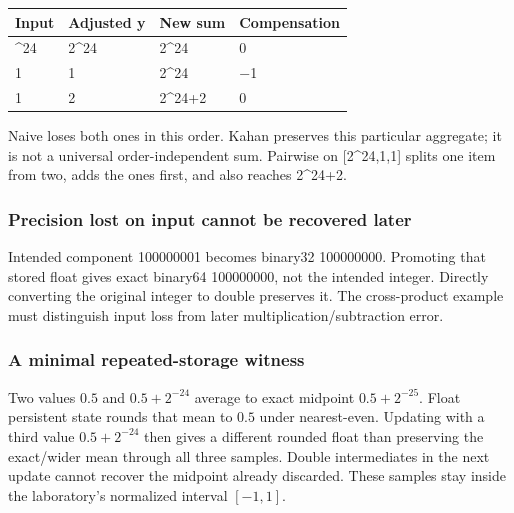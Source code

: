 \hypertarget{appendix-92ff77d4dfdc-kahan-trace-at-binary32-precision}{}

{\def\LTcaptype{none} %
\begin{longtable}[]{@{}llll@{}}
\toprule\noalign{}
Input & Adjusted y & New sum & Compensation \\
\midrule\noalign{}
\endhead
\bottomrule\noalign{}
\endlastfoot
2\^{}24 & 2\^{}24 & 2\^{}24 & 0 \\
1 & 1 & 2\^{}24 & −1 \\
1 & 2 & 2\^{}24+2 & 0 \\
\end{longtable}
}

Naive loses both ones in this order. Kahan preserves this particular aggregate; it is not a universal order-independent sum. Pairwise on {[}2\^{}24,1,1{]} splits one item from two, adds the ones first, and also reaches 2\^{}24+2.

\subsubsection{Precision lost on input cannot be recovered later}\label{appendix-92ff77d4dfdc-precision-lost-on-input-cannot-be-recovered-later}

\hypertarget{appendix-92ff77d4dfdc-precision-lost-on-input-cannot-be-recovered-later}{}

Intended component 100000001 becomes binary32 100000000. Promoting that stored float gives exact binary64 100000000, not the intended integer. Directly converting the original integer to double preserves it. The cross-product example must distinguish input loss from later multiplication/subtraction error.

\subsubsection{A minimal repeated-storage witness}\label{appendix-92ff77d4dfdc-a-minimal-repeated-storage-witness}

\hypertarget{appendix-92ff77d4dfdc-a-minimal-repeated-storage-witness}{}

Two values \(0.5\) and \(0.5+2^{-24}\) average to exact midpoint \(0.5+2^{-25}\). Float persistent state rounds that mean to \(0.5\) under nearest-even. Updating with a third value \(0.5+2^{-24}\) then gives a different rounded float than preserving the exact/wider mean through all three samples. Double intermediates in the next update cannot recover the midpoint already discarded. These samples stay inside the laboratory's normalized interval \([-1,1]\).


